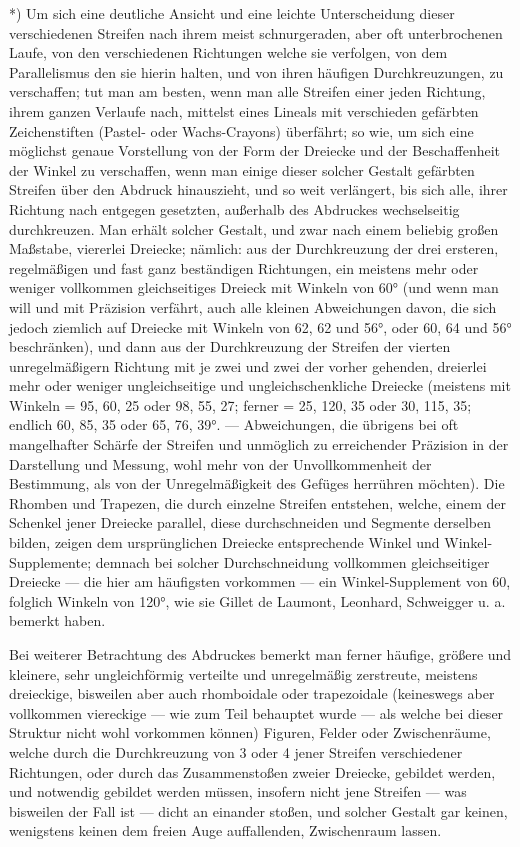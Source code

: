 \documentclass[a4paper, 11pt, oneside, german]{article}
\begin{document}
*) Um sich eine deutliche Ansicht und eine leichte Unterscheidung dieser verschiedenen Streifen nach ihrem meist schnurgeraden, aber oft unterbrochenen Laufe, von den verschiedenen Richtungen welche sie verfolgen, von dem Parallelismus den sie hierin halten, und von ihren häufigen Durchkreuzungen, zu verschaffen; tut man am besten, wenn man alle Streifen einer jeden Richtung, ihrem ganzen Verlaufe nach, mittelst eines Lineals mit verschieden gefärbten Zeichenstiften (Pastel- oder Wachs-Crayons) überfährt; so wie, um sich eine möglichst genaue Vorstellung von der Form der Dreiecke und der Beschaffenheit der Winkel zu verschaffen, wenn man einige dieser solcher Gestalt gefärbten Streifen über den Abdruck hinauszieht, und so weit verlängert, bis sich alle, ihrer Richtung nach entgegen gesetzten, außerhalb des Abdruckes wechselseitig durchkreuzen. Man erhält solcher Gestalt, und zwar nach einem beliebig großen Maßstabe, viererlei Dreiecke; nämlich: aus der Durchkreuzung der drei ersteren, regelmäßigen und fast ganz beständigen Richtungen, ein meistens mehr oder weniger vollkommen gleichseitiges Dreieck mit Winkeln von 60° (und wenn man will und mit Präzision verfährt, auch alle kleinen Abweichungen davon, die sich jedoch ziemlich auf Dreiecke mit Winkeln von 62, 62 und 56°, oder 60, 64 und 56° beschränken), und dann aus der Durchkreuzung der Streifen der vierten unregelmäßigern Richtung mit je zwei und zwei der vorher gehenden, dreierlei mehr oder weniger ungleichseitige und ungleichschenkliche Dreiecke (meistens mit Winkeln = 95, 60, 25 oder 98, 55, 27; ferner = 25, 120, 35 oder 30, 115, 35; endlich 60, 85, 35 oder 65, 76, 39°. --- Abweichungen, die übrigens bei oft mangelhafter Schärfe der Streifen und unmöglich zu erreichender Präzision in der Darstellung und Messung, wohl mehr von der Unvollkommenheit der Bestimmung, als von der Unregelmäßigkeit des Gefüges herrühren möchten). Die Rhomben und Trapezen, die durch einzelne Streifen entstehen, welche, einem der Schenkel jener Dreiecke parallel, diese durchschneiden und Segmente derselben bilden, zeigen dem ursprünglichen Dreiecke entsprechende Winkel und Winkel-Supplemente; demnach bei solcher Durchschneidung vollkommen gleichseitiger Dreiecke --- die hier am häufigsten vorkommen --- ein Winkel-Supplement von 60, folglich Winkeln von 120°, wie sie Gillet de Laumont, Leonhard, Schweigger u. a. bemerkt haben.

Bei weiterer Betrachtung des Abdruckes bemerkt man ferner häufige, größere und kleinere, sehr ungleichförmig verteilte und unregelmäßig zerstreute, meistens dreieckige, bisweilen aber auch rhomboidale oder trapezoidale (keineswegs aber vollkommen viereckige --- wie zum Teil behauptet wurde --- als welche bei dieser Struktur nicht wohl vorkommen können) Figuren, Felder oder Zwischenräume, welche durch die Durchkreuzung von 3 oder 4 jener Streifen verschiedener Richtungen, oder durch das Zusammenstoßen zweier Dreiecke, gebildet werden, und notwendig gebildet werden müssen, insofern nicht jene Streifen --- was bisweilen der Fall ist --- dicht an einander stoßen, und solcher Gestalt gar keinen, wenigstens keinen dem freien Auge auffallenden, Zwischenraum lassen.
\end{document}

